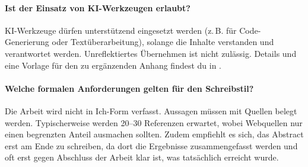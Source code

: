 \paragraph{Ist der Einsatz von KI-Werkzeugen erlaubt?}
KI-Werkzeuge dürfen unterstützend eingesetzt werden (z.\,B. für Code-Generierung oder Textüberarbeitung), solange die Inhalte verstanden und verantwortet werden. Unreflektiertes Übernehmen ist nicht zulässig. Details und eine Vorlage für den zu ergänzenden Anhang findest du in .

\paragraph{Welche formalen Anforderungen gelten für den Schreibstil?}
Die Arbeit wird nicht in Ich-Form verfasst. Aussagen müssen mit Quellen belegt werden. Typischerweise werden 20–30 Referenzen erwartet, wobei Webquellen nur einen begrenzten Anteil ausmachen sollten. Zudem empfiehlt es sich, das Abstract erst am Ende zu schreiben, da dort die Ergebnisse zusammengefasst werden und oft erst gegen Abschluss der Arbeit klar ist, was tatsächlich erreicht wurde.
